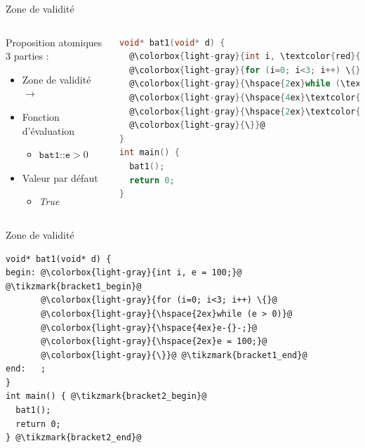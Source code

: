 \documentclass{beamer}
\newcommand{\tikzmark}[2][]{%
  \tikz[remember picture,overlay,baseline=-.5ex] \node[#1] (#2) {};%
}
\newcommand*{\drawBrace}[4][0pt]{%
    \node[draw=none, fit={(#2) (#3)}, inner sep=0pt] (rectg) {};%
    \draw [decoration={brace,amplitude=0.3em},decorate,very thick,red]%
      ([xshift=#1]rectg.north east) --%
      coordinate[right=1em, midway] (#2#3)
      ([xshift=#1]rectg.south east);%
    \node[right=1.5em of #2#3] (#2#3-comment) {#4};
    \draw (#2#3-comment.west) edge (#2#3);
}%
\begin{document}
\begin{frame}[fragile]{Zone de validité}
\begin{columns}[onlytextwidth, c]

  \begin{block}{Proposition atomiques}
    3 parties :
  \begin{itemize}
    \setlength{\itemsep}{1.5em}
  \item Zone de validité $\rightarrow$
    \item Fonction d'évaluation
      \begin{itemize}
        \item $\texttt{bat1::e} > 0$
      \end{itemize}
    \item Valeur par défaut
      \begin{itemize}
        \item \emph{True}
      \end{itemize}
  \end{itemize}
  \end{block}


\begin{lstlisting}[language=C]
void* bat1(void* d) {
  @\colorbox{light-gray}{int i, \textcolor{red}{e} = 100;}@
  @\colorbox{light-gray}{for (i=0; i<3; i++) \{}@
  @\colorbox{light-gray}{\hspace{2ex}while (\textcolor{red}{e} > 0)}@
  @\colorbox{light-gray}{\hspace{4ex}\textcolor{red}{e}-{}-;}@
  @\colorbox{light-gray}{\hspace{2ex}\textcolor{red}{e} = 100;}@
  @\colorbox{light-gray}{\}}@
}
int main() {
  bat1();
  return 0;
}
\end{lstlisting}
\end{columns}
\end{frame}

\begin{frame}[fragile]{Zone de validité}
\begin{lstlisting}
void* bat1(void* d) {
begin: @\colorbox{light-gray}{int i, e = 100;}@ @\tikzmark{bracket1_begin}@
       @\colorbox{light-gray}{for (i=0; i<3; i++) \{}@
       @\colorbox{light-gray}{\hspace{2ex}while (e > 0)}@
       @\colorbox{light-gray}{\hspace{4ex}e-{}-;}@
       @\colorbox{light-gray}{\hspace{2ex}e = 100;}@
       @\colorbox{light-gray}{\}}@ @\tikzmark{bracket1_end}@
end:   ;
}
int main() { @\tikzmark{bracket2_begin}@
  bat1();
  return 0;
} @\tikzmark{bracket2_end}@
\end{lstlisting}


\end{frame}
\end{document}
